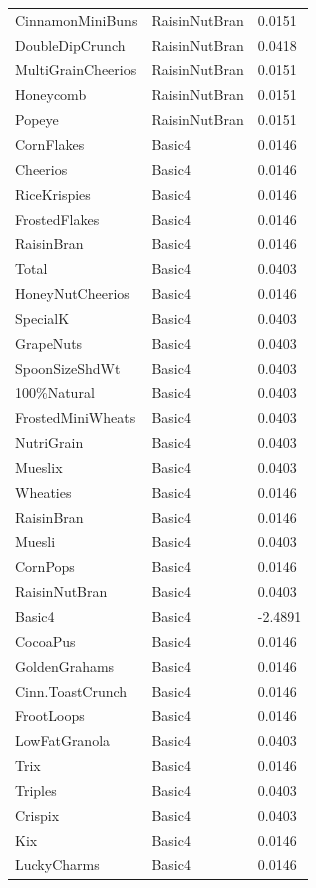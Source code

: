 \begin{table}[!htbp]
\begin{tabular}{lll}
\\
CinnamonMiniBuns & RaisinNutBran & 0.0151
\\
DoubleDipCrunch & RaisinNutBran & 0.0418
\\
MultiGrainCheerios & RaisinNutBran & 0.0151
\\
Honeycomb & RaisinNutBran & 0.0151
\\
Popeye & RaisinNutBran & 0.0151
\\
CornFlakes & Basic4 & 0.0146
\\
Cheerios & Basic4 & 0.0146
\\
RiceKrispies & Basic4 & 0.0146
\\
FrostedFlakes & Basic4 & 0.0146
\\
RaisinBran & Basic4 & 0.0146
\\
Total & Basic4 & 0.0403
\\
HoneyNutCheerios & Basic4 & 0.0146
\\
SpecialK & Basic4 & 0.0403
\\
GrapeNuts & Basic4 & 0.0403
\\
SpoonSizeShdWt & Basic4 & 0.0403
\\
100\%Natural & Basic4 & 0.0403
\\
FrostedMiniWheats & Basic4 & 0.0403
\\
NutriGrain & Basic4 & 0.0403
\\
Mueslix & Basic4 & 0.0403
\\
Wheaties & Basic4 & 0.0146
\\
RaisinBran & Basic4 & 0.0146
\\
Muesli & Basic4 & 0.0403
\\
CornPops & Basic4 & 0.0146
\\
RaisinNutBran & Basic4 & 0.0403
\\
Basic4 & Basic4 & -2.4891
\\
CocoaPus & Basic4 & 0.0146
\\
GoldenGrahams & Basic4 & 0.0146
\\
Cinn.ToastCrunch & Basic4 & 0.0146
\\
FrootLoops & Basic4 & 0.0146
\\
LowFatGranola & Basic4 & 0.0403
\\
Trix & Basic4 & 0.0146
\\
Triples & Basic4 & 0.0403
\\
Crispix & Basic4 & 0.0403
\\
Kix & Basic4 & 0.0146
\\
LuckyCharms & Basic4 & 0.0146
\\

\end{tabular}
\end{table}
